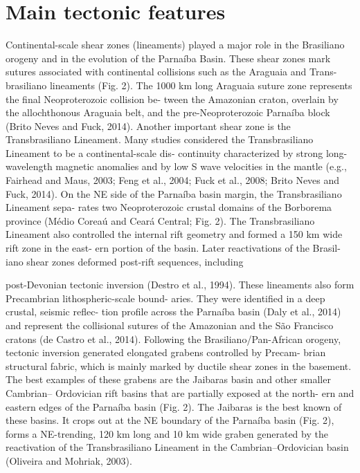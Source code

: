 \documentclass[long]{geophysics}
\begin{document}
\section{Main tectonic features}

Continental-scale shear zones (lineaments) played a major
role in the Brasiliano orogeny and in the evolution of the
Parnaíba Basin. These shear zones mark sutures associated
with continental collisions such as the Araguaia and Trans-
brasiliano lineaments (Fig. 2). The 1000 km long Araguaia
suture zone represents the final Neoproterozoic collision be-
tween the Amazonian craton, overlain by the allochthonous
Araguaia belt, and the pre-Neoproterozoic Parnaíba block
(Brito Neves and Fuck, 2014). Another important shear zone
is the Transbrasiliano Lineament. Many studies considered
the Transbrasiliano Lineament to be a continental-scale dis-
continuity characterized by strong long-wavelength magnetic
anomalies and by low S wave velocities in the mantle (e.g.,
Fairhead and Maus, 2003; Feng et al., 2004; Fuck et al.,
2008; Brito Neves and Fuck, 2014). On the NE side of the
Parnaíba basin margin, the Transbrasiliano Lineament sepa-
rates two Neoproterozoic crustal domains of the Borborema
province (Médio Coreaú and Ceará Central; Fig. 2). The
Transbrasiliano Lineament also controlled the internal rift
geometry and formed a 150 km wide rift zone in the east-
ern portion of the basin. Later reactivations of the Brasil-
iano shear zones deformed post-rift sequences, including

post-Devonian tectonic inversion (Destro et al., 1994). These
lineaments also form Precambrian lithospheric-scale bound-
aries. They were identified in a deep crustal, seismic reflec-
tion profile across the Parnaíba basin (Daly et al., 2014) and
represent the collisional sutures of the Amazonian and the
São Francisco cratons (de Castro et al., 2014).
Following the Brasiliano/Pan-African orogeny, tectonic
inversion generated elongated grabens controlled by Precam-
brian structural fabric, which is mainly marked by ductile
shear zones in the basement. The best examples of these
grabens are the Jaibaras basin and other smaller Cambrian–
Ordovician rift basins that are partially exposed at the north-
ern and eastern edges of the Parnaíba basin (Fig. 2). The
Jaibaras is the best known of these basins. It crops out at
the NE boundary of the Parnaíba basin (Fig. 2), forms a
NE-trending, 120 km long and 10 km wide graben generated
by the reactivation of the Transbrasiliano Lineament in the
Cambrian–Ordovician basin (Oliveira and Mohriak, 2003).
\end{document}
